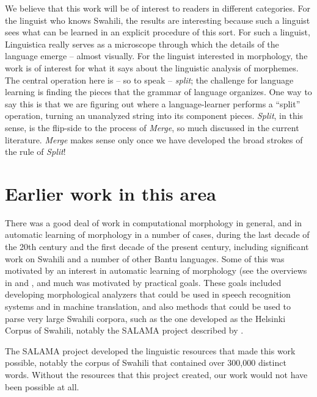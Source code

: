 \documentclass[output=paper,colorlinks,citecolor=brown,
]{langscibook}
\begin{document}
We believe that this work will be of interest to readers in different categories. For the linguist who knows Swahili, the results are interesting because such a linguist sees what can be learned in an explicit procedure of this sort. For such a linguist, Linguistica really serves as a microscope through which the details of the language emerge -- almost visually. For the linguist interested in morphology, the work is of interest for what it says about the linguistic analysis of morphemes. The central operation here is -- so to speak -- \textit{split}; the challenge for language learning is finding the pieces that the grammar of language organizes. One way to say this is that we are figuring out where a language-learner performs a ``split'' operation, turning an unanalyzed string into its component pieces. \textit{Split}, in this sense, is the flip-side to the process of \textit{Merge}, so much discussed in the current literature. \textit{Merge} makes sense only once we have developed the broad strokes of the rule of \textit{Split}!


\section{Earlier work in this area}

There was a good deal of work in computational morphology in general, and in automatic learning of morphology in a number of cases, during the last decade of the 20th century and the first decade of the present century, including significant work on Swahili and a number of other Bantu languages. Some of this was motivated by an interest in automatic learning of morphology (see the overviews in \cite{Goldsmith201014} and \cite{GoldsmithEtAl2017}, and much was motivated by practical goals. These goals included developing morphological analyzers that could be used in speech recognition systems and in machine translation, and also methods that could be used to parse very large Swahili corpora, such as the one developed as the Helsinki Corpus of Swahili, notably the SALAMA project described by \cite{Hurskainen1992, Hurskainen1999, Hurskainen2004Compilers}. 

The SALAMA project developed the linguistic resources that made this work possible, notably the corpus of Swahili that contained over 300,000 distinct words. Without the resources that this project created, our work would not have been possible at all. 
\end{document}
